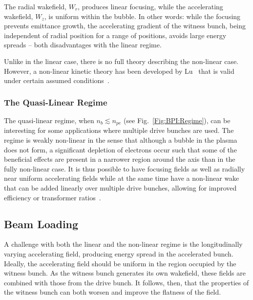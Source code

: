 The radial wakefield, $W_{r}$, produces linear focusing, while the accelerating wakefield, $W_{z}$, is uniform within the bubble. In other words: while the focusing prevents emittance growth, the accelerating gradient of the witness bunch, being independent of radial position for a range of positions, avoids large energy spreads -- both disadvantages with the linear regime.

Unlike in the linear case, there is no full theory describing the non-linear case. However, a non-linear kinetic theory has been developed by Lu \etal ~that is valid under certain assumed conditions~\cite{lu:2006a,lu:2006}.

\subsubsection{The Quasi-Linear Regime}
\label{Int:BPI:QLin}

The quasi-linear regime, when $n_{b} \lesssim n_{pe}$ (see Fig.~\ref{Fig:BPI:Regime}), can be interesting for some applications where multiple drive bunches are used. The regime is weakly non-linear in the sense that although a bubble in the plasma does not form, a significant depletion of electrons occur such that some of the beneficial effects are present in a narrower region around the axis than in the fully non-linear case. It is thus possible to have focusing fields as well as radially near uniform accelerating fields while at the same time have a non-linear wake that can be added linearly over multiple drive bunches, allowing for improved efficiency or transformer ratios~\cite{muggli:2017,rosenzweig:2010}.

\subsection{Beam Loading}
\label{Int:BPI:BLoad}

A challenge with both the linear and the non-linear regime is the longitudinally varying accelerating field, producing energy spread in the accelerated bunch. Ideally, the accelerating field should be uniform in the region occupied by the witness bunch. As the witness bunch generates its own wakefield, these fields are combined with those from the drive bunch. It follows, then, that the properties of the witness bunch can both worsen and improve the flatness of the field.

